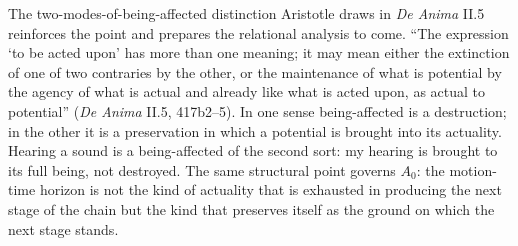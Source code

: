 The two-modes-of-being-affected distinction Aristotle draws in \textit{De Anima} II.5 reinforces the point and prepares the relational analysis to come. ``The expression `to be acted upon' has more than one meaning; it may mean either the extinction of one of two contraries by the other, or the maintenance of what is potential by the agency of what is actual and already like what is acted upon, as actual to potential'' (\textit{De Anima} II.5, 417b2--5). In one sense being-affected is a destruction; in the other it is a preservation in which a potential is brought into its actuality. Hearing a sound is a being-affected of the second sort: my hearing is brought to its full being, not destroyed. The same structural point governs $A_0$: the motion-time horizon is not the kind of actuality that is exhausted in producing the next stage of the chain but the kind that preserves itself as the ground on which the next stage stands.

